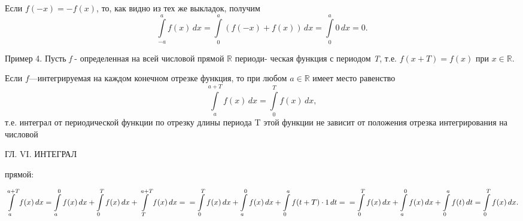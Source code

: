 \documentclass[a4paper, 10pt]{book}
\begin{document}
    
    \par
    Если $f(-x) = -f(x)$, то, как видно из тех же выкладок, получим
    \[
    \int\limits_{-a}^{a} f(x) \,dx =
    \int\limits_{0}^{a} (f(-x) + f(x)) \,dx =
    \int\limits_{0}^{a} 0 \,dx = 0.
    \]


    \par
    Пример 4. Пусть \textit{f} - определенная на всей числовой прямой $\mathbb{R}$ периоди-
    ческая функция с периодом \textit{T}, т.е. $f(x+T)=f(x)$ при $x \in \mathbb{R}$.


    \par
    Если $f$—интегрируемая на каждом конечном отрезке функция, то при любом $a \in \mathbb{R}$ имеет место равенство
    \[
    \int\limits_{a}^{a+T} f(x) \,dx = \int\limits_{0}^{T} f(x) \,dx,
    \]
    т.е. интеграл от периодической функции по отрезку длины периода T этой функции не зависит от положения отрезка интегрирования на числовой

    \newpage
    \begin{center}
        ГЛ. VI. ИНТЕГРАЛ
    \end{center}

    \par\noindent
    прямой:

    
    $
    \displaystyle
    \int\limits_{a}^{a+T} f(x) \,dx = \int\limits_{a}^{0} f(x) \,dx + \int\limits_{0}^{T} f(x) \,dx + \int\limits_{T}^{a+T} f(x) \,dx = 
    \\
    \null\hfill =\int\limits_{0}^{T} f(x) \,dx + \int\limits_{a}^{0} f(x) \,dx + \int\limits_{0}^{a} f(t + T)\cdot1 \,dt=
    \\
    \null\hfill =\int\limits_{0}^{T} f(x) \,dx + \int\limits_{a}^{0} f(x) \,dx + \int\limits_{0}^{a} f(t) \,dt =\int\limits_{0}^{T} f(x) \,dx.
    $
\end{document}
